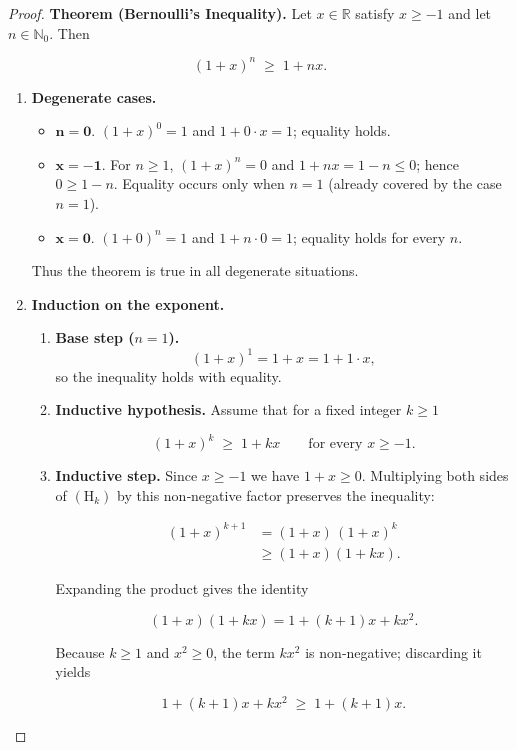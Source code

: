 \begin{proof}
\textbf{Theorem (Bernoulli’s Inequality).}  
Let \(x\in\mathbb{R}\) satisfy \(x\ge -1\) and let \(n\in\mathbb{N}_{0}\). Then  

\[
(1+x)^{n}\;\ge\;1+nx .
\]

\begin{enumerate}
\item \textbf{Degenerate cases.}
\begin{itemize}
\item \(\mathbf{n=0}\).  \((1+x)^{0}=1\) and \(1+0\cdot x=1\); equality holds.
\item \(\mathbf{x=-1}\).  For \(n\ge1\), \((1+x)^{n}=0\) and \(1+nx=1-n\le0\); hence \(0\ge1-n\). Equality occurs only when \(n=1\) (already covered by the case \(n=1\)).
\item \(\mathbf{x=0}\).  \((1+0)^{n}=1\) and \(1+n\cdot0=1\); equality holds for every \(n\).
\end{itemize}
Thus the theorem is true in all degenerate situations.

\item \textbf{Induction on the exponent.}
\begin{enumerate}
\item \textbf{Base step (\(n=1\)).}
\[
(1+x)^{1}=1+x=1+1\cdot x ,
\]
so the inequality holds with equality.

\item \textbf{Inductive hypothesis.}  
Assume that for a fixed integer \(k\ge1\)

\[
\boxed{(1+x)^{k}\;\ge\;1+kx}\qquad\text{for every }x\ge-1 . \tag{H\(_k\)}
\]

\item \textbf{Inductive step.}  
Since \(x\ge-1\) we have \(1+x\ge0\). Multiplying both sides of \((\text{H}_k)\) by this non‑negative factor preserves the inequality:

\begin{align*}
(1+x)^{k+1}
   &= (1+x)\,(1+x)^{k} \\
   &\ge (1+x)(1+kx). \tag{1}
\end{align*}

Expanding the product gives the identity  

\[
(1+x)(1+kx)=1+(k+1)x+kx^{2}. \tag{2}
\]

Because \(k\ge1\) and \(x^{2}\ge0\), the term \(kx^{2}\) is non‑negative; discarding it yields  

\[
1+(k+1)x+kx^{2}\;\ge\;1+(k+1)x . \tag{3}
\]


\end{enumerate}
\end{enumerate}
\end{proof}
